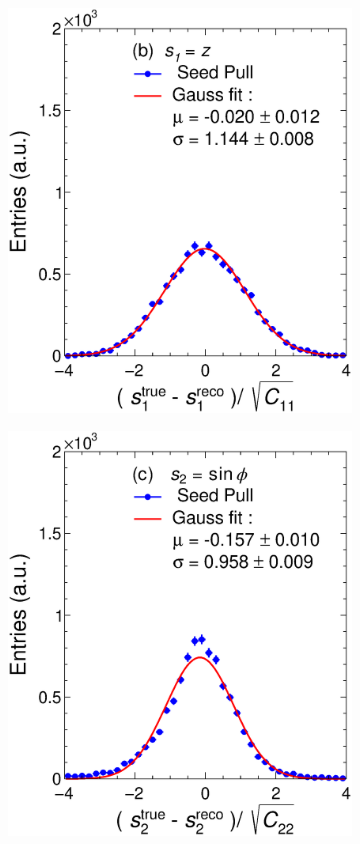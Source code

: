 \begin{figure}[t]
\begin{subfigure}{0.32\textwidth}
         \includegraphics[width=\textwidth]{figures/ch5-KF_NDGAr/FullSample/Int/Units/IdealUnit1Seed.eps}
         \caption{}
         \label{fig:resp1SeedGAr_IntI}
     \end{subfigure}
    \begin{subfigure}{0.32\textwidth}
         \centering
         \includegraphics[width=\textwidth]{figures/ch5-KF_NDGAr/FullSample/Int/Units/IdealUnit2Seed.eps}

\end{subfigure}
\end{figure}
